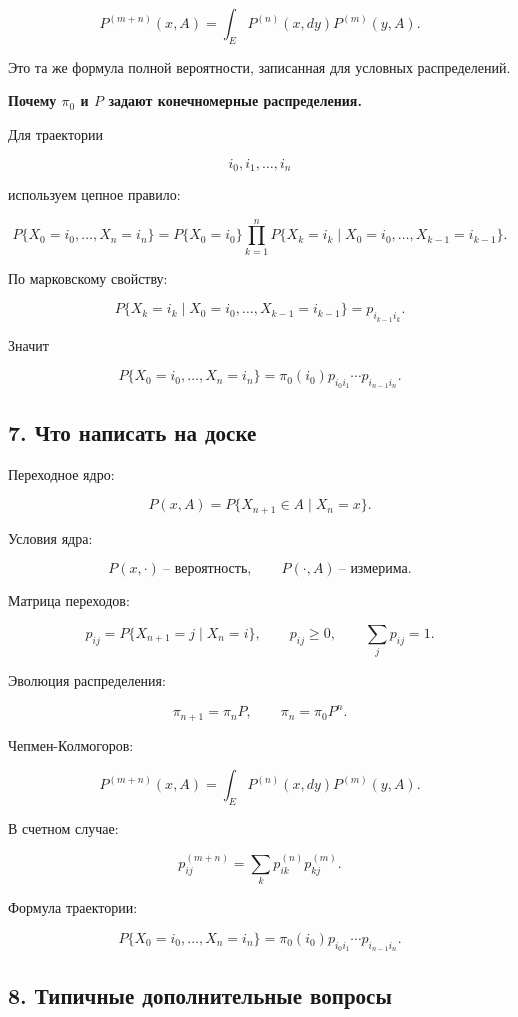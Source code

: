 \documentclass[
  11pt,
  a4paper,
]{article}
\begin{document}
\[
P^{(m+n)}(x,A)
=
\int_E P^{(n)}(x,dy)P^{(m)}(y,A).
\]

Это та же формула полной вероятности, записанная для условных
распределений.

\textbf{Почему \(\pi_0\) и \(P\) задают конечномерные распределения.}

Для траектории

\[
i_0,i_1,\ldots,i_n
\]

используем цепное правило:

\[
P\{X_0=i_0,\ldots,X_n=i_n\}
=
P\{X_0=i_0\}
\prod_{k=1}^n
P\{X_k=i_k\mid X_0=i_0,\ldots,X_{k-1}=i_{k-1}\}.
\]

По марковскому свойству:

\[
P\{X_k=i_k\mid X_0=i_0,\ldots,X_{k-1}=i_{k-1}\}
=
p_{i_{k-1}i_k}.
\]

Значит

\[
P\{X_0=i_0,\ldots,X_n=i_n\}
=
\pi_0(i_0)p_{i_0i_1}\cdots p_{i_{n-1}i_n}.
\]

\subsection{7. Что написать на
доске}\label{ux447ux442ux43e-ux43dux430ux43fux438ux441ux430ux442ux44c-ux43dux430-ux434ux43eux441ux43aux435}

Переходное ядро:

\[
P(x,A)=P\{X_{n+1}\in A\mid X_n=x\}.
\]

Условия ядра:

\[
P(x,\cdot)\ \text{-- вероятность},
\qquad
P(\cdot,A)\ \text{-- измерима}.
\]

Матрица переходов:

\[
p_{ij}=P\{X_{n+1}=j\mid X_n=i\},
\qquad
p_{ij}\ge0,
\qquad
\sum_jp_{ij}=1.
\]

Эволюция распределения:

\[
\pi_{n+1}=\pi_nP,
\qquad
\pi_n=\pi_0P^n.
\]

Чепмен-Колмогоров:

\[
P^{(m+n)}(x,A)
=
\int_E P^{(n)}(x,dy)P^{(m)}(y,A).
\]

В счетном случае:

\[
p_{ij}^{(m+n)}
=
\sum_k p_{ik}^{(n)}p_{kj}^{(m)}.
\]

Формула траектории:

\[
P\{X_0=i_0,\ldots,X_n=i_n\}
=
\pi_0(i_0)p_{i_0i_1}\cdots p_{i_{n-1}i_n}.
\]

\subsection{8. Типичные дополнительные
вопросы}\label{ux442ux438ux43fux438ux447ux43dux44bux435-ux434ux43eux43fux43eux43bux43dux438ux442ux435ux43bux44cux43dux44bux435-ux432ux43eux43fux440ux43eux441ux44b}
\end{document}
